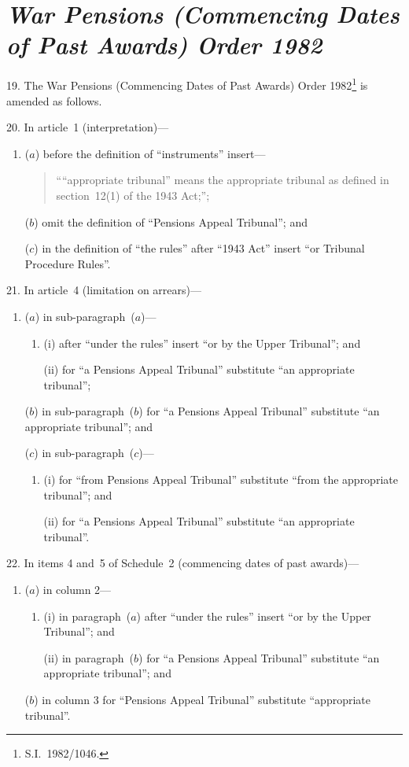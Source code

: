 \documentclass[12pt,a4paper]{article}
\begin{document}
\section*{\itshape War Pensions (Commencing Dates of Past Awards) Order 1982}

19.  The War Pensions (Commencing Dates of Past Awards) Order 1982\footnote{S.I.~1982/1046.} is amended as follows.

\medskip

20.  In article~1 (interpretation)—
\begin{enumerate}\item[]
($a$) before the definition of “instruments” insert—
\begin{quotation}
““appropriate tribunal” means the appropriate tribunal as defined in section~12(1) of the 1943 Act;”;
\end{quotation}

($b$) omit the definition of “Pensions Appeal Tribunal”; and

($c$) in the definition of “the rules” after “1943 Act” insert “or Tribunal Procedure Rules”.
\end{enumerate}

\medskip

21.  In article~4 (limitation on arrears)—
\begin{enumerate}\item[]
($a$) in sub-paragraph~($a$)—
\begin{enumerate}\item[]
(i) after “under the rules” insert “or by the Upper Tribunal”; and

(ii) for “a Pensions Appeal Tribunal” substitute “an appropriate tribunal”;
\end{enumerate}

($b$) in sub-paragraph~($b$)  for “a Pensions Appeal Tribunal” substitute “an appropriate tribunal”; and

($c$) in sub-paragraph~($c$)—
\begin{enumerate}\item[]
(i) for “from Pensions Appeal Tribunal” substitute “from the appropriate tribunal”; and

(ii) for “a Pensions Appeal Tribunal” substitute “an appropriate tribunal”.
\end{enumerate}
\end{enumerate}

\medskip

22.  In items 4 and~5 of Schedule~2 (commencing dates of past awards)—
\begin{enumerate}\item[]
($a$) in column 2—
\begin{enumerate}\item[]
(i) in paragraph~($a$)  after “under the rules” insert “or by the Upper Tribunal”; and

(ii) in paragraph~($b$)  for “a Pensions Appeal Tribunal” substitute “an appropriate tribunal”; and
\end{enumerate}

($b$) in column 3 for “Pensions Appeal Tribunal” substitute “appropriate tribunal”.
\end{enumerate}
\end{document}
